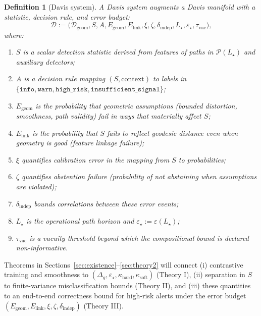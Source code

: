 \documentclass[11pt]{article}
\newtheorem{definition}{Definition}
\begin{document}
\begin{definition}[Davis system]\label{def:davis-system}
A \emph{Davis system} augments a Davis manifold with a statistic, decision rule, and
error budget:
\[
    \mathcal{D}
    :=
    \bigl(\mathcal{D}_{\text{geom}}, S, A,
    E_{\text{geom}}, E_{\text{link}}, \xi, \zeta, \delta_{\text{indep}},
    L_\star, \varepsilon_\star, \tau_{\text{vac}}\bigr),
\]
where:
\begin{enumerate}[label=(\roman*),leftmargin=*]
    \item $S$ is a scalar detection statistic derived from features of paths in $\mathcal{P}(L_\star)$
    and auxiliary detectors;
    \item $A$ is a decision rule mapping $(S,\text{context})$ to labels in
    $\{\texttt{info},\texttt{warn},\texttt{high\_risk},\texttt{insufficient\_signal}\}$;
    \item $E_{\text{geom}}$ is the probability that geometric assumptions (bounded distortion,
    smoothness, path validity) fail in ways that materially affect $S$;
    \item $E_{\text{link}}$ is the probability that $S$ fails to reflect geodesic distance even when
    geometry is good (feature linkage failure);
    \item $\xi$ quantifies calibration error in the mapping from $S$ to probabilities;
    \item $\zeta$ quantifies abstention failure (probability of not abstaining when assumptions
    are violated);
    \item $\delta_{\text{indep}}$ bounds correlations between these error events;
    \item $L_\star$ is the operational path horizon and $\varepsilon_\star := \varepsilon(L_\star)$;
    \item $\tau_{\text{vac}}$ is a vacuity threshold beyond which the compositional bound is
    declared non-informative.
\end{enumerate}
\end{definition}

Theorems in Sections~\ref{sec:existence}--\ref{sec:theory2} will connect (i) contrastive training
and smoothness to $(\Delta_g,\varepsilon_\star,\kappa_{\mathrm{hard}},\kappa_{\mathrm{soft}})$ (Theory I),
(ii) separation in $S$ to finite-variance misclassification bounds (Theory II), and (iii) these
quantities to an end-to-end correctness bound for high-risk alerts under the error budget
$(E_{\text{geom}},E_{\text{link}},\xi,\zeta,\delta_{\text{indep}})$ (Theory III).
\end{document}
